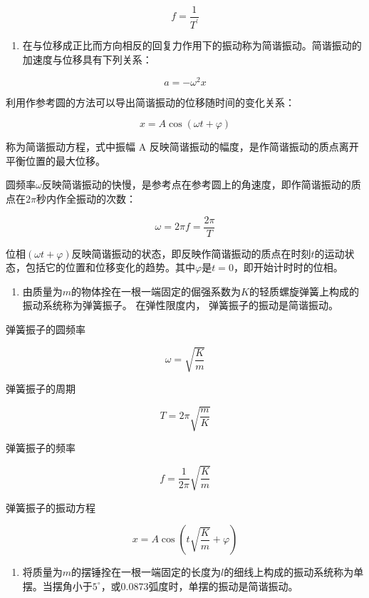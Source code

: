 \[
f = \frac {1}{T ^ {\prime}}
\]

\begin{enumerate}
\def\labelenumi{\arabic{enumi}.}
\setcounter{enumi}{2}
\tightlist
\item
  在与位移成正比而方向相反的回复力作用下的振动称为简谐振动。简谐振动的加速度与位移具有下列关系：
\end{enumerate}

\[
a = - \omega^ {2} x
\]

利用作参考圆的方法可以导出简谐振动的位移随时间的变化关系：

\[
x = A \cos (\omega t + \varphi)
\]

称为简谐振动方程，式中振幅 A
反映简谐振动的幅度，是作简谐振动的质点离开平衡位置的最大位移。

圆频率\(\omega\)反映简谐振动的快慢，是参考点在参考圆上的角速度，即作简谐振动的质点在\(2\pi\)秒内作全振动的次数：

\[
\omega=2\pi f=\frac{2\pi}{T}
\]

位相\((\omega t + \varphi)\)反映简谐振动的状态，即反映作简谐振动的质点在时刻\(t\)的运动状态，包括它的位置和位移变化的趋势。其中\(\varphi\)是\(t = 0\)，即开始计时时的位相。

\begin{enumerate}
\def\labelenumi{\arabic{enumi}.}
\setcounter{enumi}{3}
\tightlist
\item
  由质量为\(m\)的物体拴在一根一端固定的倔强系数为\(K\)的轻质螺旋弹簧上构成的振动系统称为弹簧振子。
  在弹性限度内， 弹簧振子的振动是简谐振动。
\end{enumerate}

弹簧振子的圆频率

\[
\omega = \sqrt {\frac {K}{m}}
\]

弹簧振子的周期

\[
T = 2 \pi \sqrt {\frac {m}{K}}
\]

弹簧振子的频率

\[
f = \frac {1}{2 \pi} \sqrt {\frac {K}{m}}
\]

弹簧振子的振动方程

\[
x = A \cos \left(t \sqrt {\frac {K}{m}} + \varphi\right)
\]

\begin{enumerate}
\def\labelenumi{\arabic{enumi}.}
\setcounter{enumi}{4}
\tightlist
\item
  将质量为\(m\)的摆锤拴在一根一端固定的长度为\(l\)的细线上构成的振动系统称为单摆。当摆角小于\(5^{\circ}\)，或0.0873弧度时，单摆的振动是简谐振动。
\end{enumerate}

